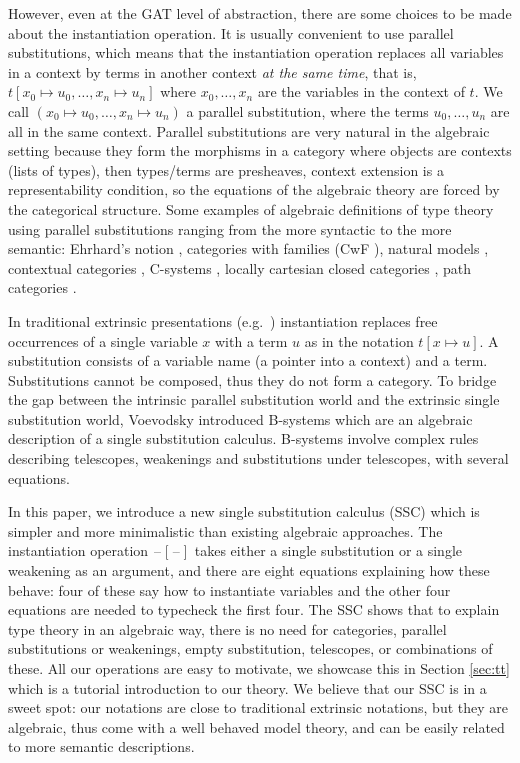 \documentclass[submission,copyright,creativecommons]{eptcs}
\newcommand{\blank}{\mathord{\hspace{1pt}\text{--}\hspace{1pt}}} %
\begin{document}
However, even at the GAT level of abstraction, there are some choices
to be made about the instantiation operation. It is usually convenient
to use parallel substitutions, which means that the instantiation
operation replaces all variables in a context by terms in another
context \emph{at the same time}, that is, $t[x_0\mapsto
  u_0,\dots,x_n\mapsto u_n]$ where $x_0,\dots,x_n$ are the variables
in the context of $t$. We call $(x_0\mapsto u_0,\dots,x_n\mapsto u_n)$
a parallel substitution, where the terms $u_0,\dots,u_n$ are
all in the same context. Parallel substitutions are very natural in
the algebraic setting because they form the morphisms in a category
where objects are contexts (lists of types), then types/terms are
presheaves, context extension is a representability condition, so the
equations of the algebraic theory are forced by the categorical
structure. Some examples of algebraic definitions of type theory using
parallel substitutions ranging from the more syntactic to the more
semantic: Ehrhard's notion \cite{ehrhard,coquandEhrhard}, categories
with families (CwF \cite{DBLP:conf/types/Dybjer95,Castellan2021}),
natural models \cite{DBLP:journals/mscs/Awodey18}, contextual
categories \cite{DBLP:journals/apal/Cartmell86}, C-systems
\cite{DBLP:journals/lmcs/AhrensLV18}, locally cartesian closed
categories \cite{DBLP:journals/mscs/ClairambaultD14}, path categories
\cite{10.1145/3204492}.

In traditional extrinsic presentations
(e.g.\ \cite{alti:phd93,DBLP:books/daglib/0005958}) instantiation
replaces free occurrences of a single variable $x$ with a term $u$ as
in the notation $t[x\mapsto u]$. A substitution consists of a
variable name (a pointer into a context) and a term. Substitutions
cannot be composed, thus they do not form a category. To bridge the
gap between the intrinsic parallel substitution world and the
extrinsic single substitution world, Voevodsky introduced B-systems
\cite{bc} which are an algebraic
description of a single substitution calculus. B-systems involve
complex rules describing telescopes, weakenings and substitutions
under telescopes, with several equations.

In this paper, we introduce a new single substitution calculus (SSC)
which is simpler and more minimalistic than existing algebraic
approaches. The instantiation operation $\blank[\blank]$ takes either a
single substitution or a single weakening as an argument, and there
are eight equations explaining how these behave: four of these say how
to instantiate variables and the other four equations are needed to
typecheck the first four. The SSC shows that to explain type theory in
an algebraic way, there is no need for categories, parallel
substitutions or weakenings, empty substitution, telescopes, or
combinations of these. All our operations are easy to motivate, we
showcase this in Section \ref{sec:tt} which is a tutorial introduction
to our theory. We believe that our SSC is in a sweet spot: our
notations are close to traditional extrinsic notations, but they are
algebraic, thus come with a well behaved model theory, and can be
easily related to more semantic descriptions.
\end{document}
